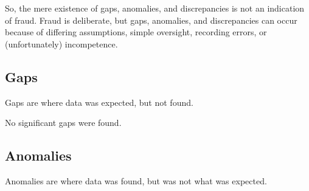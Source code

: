 So, the mere existence of gaps, anomalies, and discrepancies is not an indication of fraud. Fraud is deliberate, but gaps, anomalies, and discrepancies can occur because of differing assumptions, simple oversight, recording errors, or (unfortunately)  incompetence.

\subsection{Gaps}%
\label{sec:gaps}\indent%

Gaps are where data was expected, but not found.

No significant gaps were found.

\subsection{Anomalies}%
\label{sec:anomalies}\indent%

Anomalies are where data was found, but was not what was expected.

